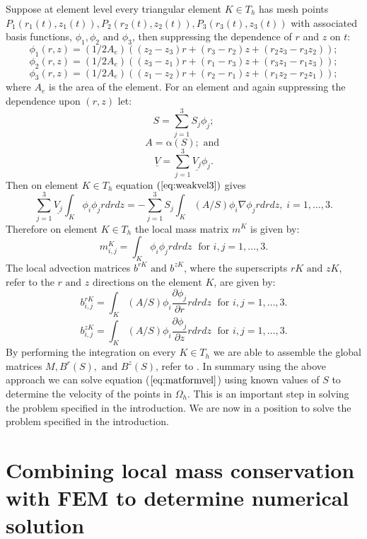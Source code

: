 \documentclass[11pt]{article}
\newcommand{\pl}{\partial}
\newcommand{\ul}{\underline}
\newcommand{\Om}{\Omega}
\newcommand{\al}{\mathrm{\alpha}}
\begin{document}
Suppose at element level every triangular element $K\in{T_h}$ has mesh points $P_1 (r_1(t),z_1(t)), P_2(r_2(t),z_2(t)), P_3(r_3(t),z_3(t))$ with associated basis functions, $\phi_1, \phi_2 \text{ and } \phi_3$, then suppressing the dependence of $r$ and $z$ on $t$:
$$ \phi_1(r,z) = (1/2A_e)\left((z_2-z_3)r+(r_3-r_2)z+(r_2z_3-r_3z_2)\right);$$
$$ \phi_2(r,z) = (1/2A_e)\left((z_3-z_1)r+(r_1-r_3)z+(r_3z_1-r_1z_3)\right);$$
$$ \phi_3(r,z) = (1/2A_e)\left((z_1-z_2)r+(r_2-r_1)z+(r_1z_2-r_2z_1)\right);$$
where $A_e$ is the area of the element. For an element and again suppressing the dependence upon $(r,z)$ let:
$$ S = \sum_{j=1}^3S_j\phi_j;$$
$$ A = \al(S); \text{ and }$$
$$ \ul{V} = \sum_{j=1}^3\ul{V_j}\phi_j.$$
Then on element $K\in T_h$ equation $(\ref{eq:weakvel3})$ gives
\begin{equation}
\label{eq:discretevel1}
\sum_{j=1}^3\ul{V_j}\int_{K}\phi_i\phi_jrdrdz = -\sum_{j=1}^3{S}_j\int_{K}(A/S)\phi_i\nabla{\phi_j}rdrdz, \; i = 1,\dots,3.
\end{equation}
Therefore on element $K\in{T_h}$ the local mass matrix $m^K$ is given by:
\begin{equation}
\label{eq:massmatrix}
m_{i,j}^K = \int_K\phi_i\phi_jrdrdz\; \text{ for } i,j = 1,\dots,3.
\end{equation}
The local advection matrices $b^{rK} \text{ and } b^{zK}$, where the superscripts $rK \text{ and } zK$,\\ refer to the $r \text{ and } z \text{ directions on the element } K$, are given by:
\begin{equation}
\label{eq:advmatrix1}
b_{i,j}^{rK} = \int_K(A/S)\phi_i\frac{  \pl{ \phi_j}}{\pl{r}   } rdrdz\; \text{ for } i,j = 1,\dots,3.
\end{equation}
\begin{equation}
\label{eq:advmatrix2}
b_{i,j}^{zK} = \int_K(A/S)\phi_i\frac{  \pl{ \phi_j}}{\pl{z}   } rdrdz\; \text{ for } i,j = 1,\dots,3.
\end{equation}
By performing the integration on every $K\in T_h$ we are able to assemble the global matrices $M,  B^r(S), \text{ and } B^z(S)$, refer to \cite{Johnson2012}. In summary using the above approach we can solve equation ($\ref{eq:matformvel}$) using known values of $S$ to determine the velocity of the points in $\Om_h$. This is an important step in solving the problem specified in the introduction. We are now in a position to solve the problem specified in the introduction.
\section{Combining local mass conservation with FEM to determine numerical solution}
\end{document}
